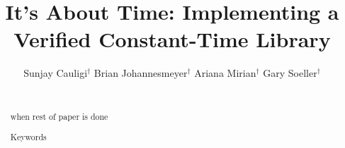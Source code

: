 \documentclass{sig-alternate-10pt}
\newcommand{\tk}{{\color{red}{\bf TK}}\xspace}
\newcommand{\TK}{\tk}
\begin{document}
\title{It's About Time: Implementing a Verified Constant-Time Library}

\author{
\alignauthor%
Sunjay Cauligi$^\dagger$\qquad
Brian Johannesmeyer$^\dagger$\qquad
Ariana Mirian$^\dagger$\qquad
Gary Soeller$^\dagger$\qquad
\smallskip\\\\%
}

\maketitle
\thispagestyle{empty}

\newcommand{\update}[1]{{\color{black}#1}\xspace}

\newcommand{\twolinecell}[2][r]{%
  \begin{tabular}[#1]{@{}c@{}}#2\end{tabular}}



\pagestyle{plain}
\thispagestyle{empty}

\begin{abstract}
\TK when rest of paper is done

\begin{keywords} 
Keywords
\end{keywords}
\end{abstract}










\end{document}
